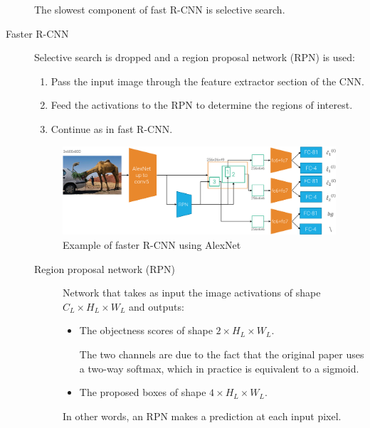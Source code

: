 \begin{description}
        \begin{remark}
            The slowest component of fast R-CNN is selective search.
        \end{remark}

    \item[Faster R-CNN] 
        Selective search is dropped and a region proposal network (RPN) is used:
        \begin{enumerate}
            \item Pass the input image through the feature extractor section of the CNN.
            \item Feed the activations to the RPN to determine the regions of interest.
            \item Continue as in fast R-CNN.
        \end{enumerate}

        \begin{figure}[H]
            \centering
            \includegraphics[width=0.8\linewidth]{./img/_faster_r_cnn.pdf}
            \caption{Example of faster R-CNN using AlexNet}
        \end{figure}

        \begin{description}
            \item[Region proposal network (RPN)] 
            Network that takes as input the image activations of shape $C_L \times H_L \times W_L$ and outputs:
            \begin{itemize}
                \item The objectness scores of shape $2 \times H_L \times W_L$.
                    \begin{remark}
                        The two channels are due to the fact that the original paper uses a two-way softmax, which in practice is equivalent to a sigmoid.
                    \end{remark}
                \item The proposed boxes of shape $4 \times H_L \times W_L$.
            \end{itemize}
            In other words, an RPN makes a prediction at each input pixel.


\end{description}
\end{description}
